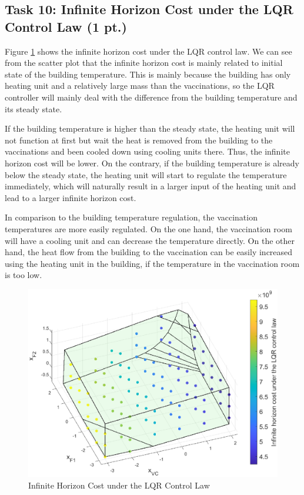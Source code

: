 \documentclass[a4paper,twoside,11pt]{article}
\numberwithin{equation}{section}
\begin{document}
\subsection{Task 10: Infinite Horizon Cost under the LQR Control Law (1 pt.)}

Figure \ref{fig:6} shows the infinite horizon cost under the LQR control law. We can see from the scatter plot that the infinite horizon cost is mainly related to initial state of the building temperature. This is mainly because the building has only heating unit and a relatively large mass than the vaccinations, so the LQR controller will mainly deal with the difference from the building temperature and its steady state. 

If the building temperature is higher than the steady state, the heating unit will not function at first but wait the heat is removed from the building to the vaccinations and been cooled down using cooling units there. Thus, the infinite horizon cost will be lower. On the contrary, if the building temperature is already below the steady state, the heating unit will start to regulate the temperature immediately, which will naturally result in a larger input of the heating unit and lead to a larger infinite horizon cost. 

In comparison to the building temperature regulation, the vaccination temperatures are more easily regulated. On the one hand, the vaccination room will have a cooling unit and can decrease the temperature directly. On the other hand, the heat flow from the building to the vaccination can be easily increased using the heating unit in the building, if the temperature in the vaccination room is too low. 

\begin{figure}[ht]
\centering
\includegraphics[scale = 0.6]{image/10.eps}
\caption{Infinite Horizon Cost under the LQR Control Law}
\label{fig:6}
\end{figure}
\end{document}

